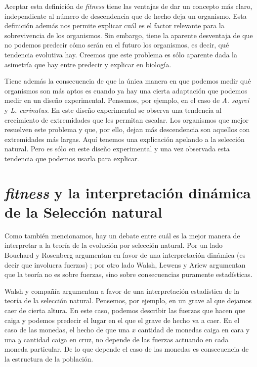 Aceptar esta definición de \emph{fitness} tiene las ventajas de dar un concepto más claro, independiente al número de descendencia que de hecho deja un organismo. Esta definición además nos permite explicar cuál es el factor relevante para la sobrevivencia de los organismos. Sin embargo, tiene la aparente desventaja de que no podemos predecir cómo serán en el futuro los organismos, es decir, qué tendencia evolutiva hay. Creemos que este problema es sólo aparente dada la asimetría que hay entre predecir y explicar en biología.

Tiene además la consecuencia de que la única manera en que podemos medir qué organismos son más aptos es cuando ya hay una cierta adaptación que podemos medir en un diseño experimental. Pensemos, por ejemplo, en el caso de \emph{A. sagrei} y \emph{L. carinatus}. En este diseño experimental se observa una tendencia al crecimiento de extremidades que les permitan escalar. Los organismos que mejor resuelven este problema y que, por ello, dejan más descendencia son aquellos con extremidades más largas. Aquí tenemos una explicación apelando a la selección natural. Pero es sólo en este diseño experimental y una vez observada esta tendencia que podemos usarla para explicar.

\section{\emph{fitness} y la interpretación dinámica de la Selección natural}

Como también mencionamos, hay un debate entre cuál es la mejor manera de interpretar a la teoría de la evolución por selección natural. Por un lado Bouchard y Rosenberg argumentan en favor de una interpretación dinámica (es decir que involucra fuerzas) \citeyear{Bouchard2004}; por otro lado Walsh, Lewens y Ariew \citeyear{Walsh2002} argumentan que la teoría no es sobre fuerzas, sino sobre consecuencias puramente estadísticas.

Walsh y compañía argumentan a favor de una interpretación estadística de la teoría de la selección natural. Pensemos, por ejemplo, en un grave al que dejamos caer de cierta altura. En este caso, podemos describir las fuerzas que hacen que caiga y podemos predecir el lugar en el que el grave de hecho va a caer. En el caso de las monedas, el hecho de que una $x$ cantidad de monedas caiga en cara y una $y$ cantidad caiga en cruz, no depende de las fuerzas actuando en cada moneda particular. De lo que depende el caso de las monedas es consecuencia de la estructura de la población.

